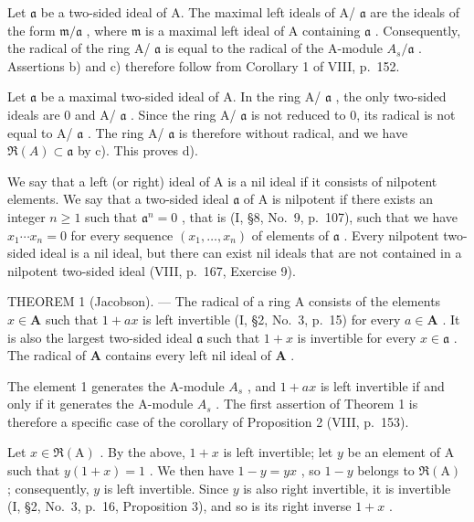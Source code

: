 Let \(\mathfrak{a}\) be a two-sided ideal of A. The maximal left ideals of A/ \(\mathfrak{a}\) are the ideals of the form \(\mathfrak{m}/\mathfrak{a}\) , where \(\mathfrak{m}\) is a maximal left ideal of A containing \(\mathfrak{a}\) . Consequently, the radical of the ring A/ \(\mathfrak{a}\) is equal to the radical of the A-module \(A_s/\mathfrak{a}\) . Assertions b) and c) therefore follow from Corollary 1 of VIII, p.~152.

Let \(\mathfrak{a}\) be a maximal two-sided ideal of A. In the ring A/ \(\mathfrak{a}\) , the only two-sided ideals are 0 and A/ \(\mathfrak{a}\) . Since the ring A/ \(\mathfrak{a}\) is not reduced to 0, its radical is not equal to A/ \(\mathfrak{a}\) . The ring A/ \(\mathfrak{a}\) is therefore without radical, and we have \(\Re(A) \subset \mathfrak{a}\) by c). This proves d).

We say that a left (or right) ideal of A is a nil ideal if it consists of nilpotent elements. We say that a two-sided ideal \(\mathfrak{a}\) of A is nilpotent if there exists an integer \(n \geqslant 1\) such that \(\mathfrak{a}^n = 0\) , that is (I, §8, No.~9, p.~107), such that we have \(x_1 \cdots x_n = 0\) for every sequence \((x_1, \ldots, x_n)\) of elements of \(\mathfrak{a}\) . Every nilpotent two-sided ideal is a nil ideal, but there can exist nil ideals that are not contained in a nilpotent two-sided ideal (VIII, p.~167, Exercise 9).

THEOREM 1 (Jacobson). --- The radical of a ring A consists of the elements \(x \in \mathbf{A}\) such that \(1 + ax\) is left invertible (I, §2, No.~3, p.~15) for every \(a \in \mathbf{A}\) . It is also the largest two-sided ideal \(\mathfrak{a}\) such that \(1 + x\) is invertible for every \(x \in \mathfrak{a}\) . The radical of \(\mathbf{A}\) contains every left nil ideal of \(\mathbf{A}\) .

The element 1 generates the A-module \(A_{s}\) , and \(1 + ax\) is left invertible if and only if it generates the A-module \(A_{s}\) . The first assertion of Theorem 1 is therefore a specific case of the corollary of Proposition 2 (VIII, p.~153).

Let \(x \in \Re(\mathrm{A})\) . By the above, \(1 + x\) is left invertible; let \(y\) be an element of \(\mathrm{A}\) such that \(y(1 + x) = 1\) . We then have \(1 - y = yx\) , so \(1 - y\) belongs to \(\Re(\mathrm{A})\) ; consequently, \(y\) is left invertible. Since \(y\) is also right invertible, it is invertible (I, §2, No.~3, p.~16, Proposition 3), and so is its right inverse \(1 + x\) .

